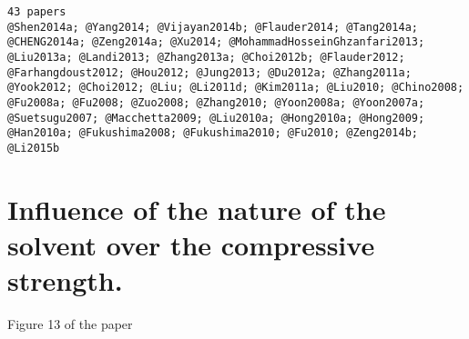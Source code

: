 \documentclass[11pt]{article}
\begin{document}
    \begin{Verbatim}[commandchars=\\\{\}]
43 papers
@Shen2014a; @Yang2014; @Vijayan2014b; @Flauder2014; @Tang2014a; @CHENG2014a; @Zeng2014a; @Xu2014; @MohammadHosseinGhzanfari2013; @Liu2013a; @Landi2013; @Zhang2013a; @Choi2012b; @Flauder2012; @Farhangdoust2012; @Hou2012; @Jung2013; @Du2012a; @Zhang2011a; @Yook2012; @Choi2012; @Liu; @Li2011d; @Kim2011a; @Liu2010; @Chino2008; @Fu2008a; @Fu2008; @Zuo2008; @Zhang2010; @Yoon2008a; @Yoon2007a; @Suetsugu2007; @Macchetta2009; @Liu2010a; @Hong2010a; @Hong2009; @Han2010a; @Fukushima2008; @Fukushima2010; @Fu2010; @Zeng2014b; @Li2015b

    \end{Verbatim}

    \hypertarget{influence-of-the-nature-of-the-solvent-over-the-compressive-strength.}{%
\section{Influence of the nature of the solvent over the compressive
strength.}\label{influence-of-the-nature-of-the-solvent-over-the-compressive-strength.}}

Figure 13 of the paper
\end{document}
